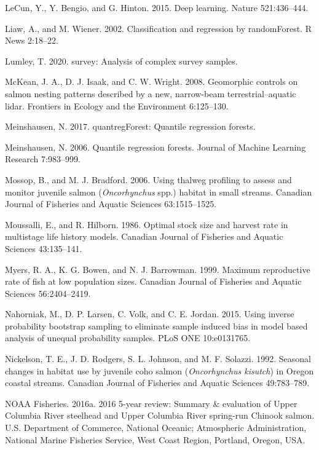 \documentclass[
  12pt,
]{article}
\begin{document}
\leavevmode\hypertarget{ref-LeCun2015}{}%
LeCun, Y., Y. Bengio, and G. Hinton. 2015. Deep learning. Nature 521:436--444.

\leavevmode\hypertarget{ref-randomForest2002}{}%
Liaw, A., and M. Wiener. 2002. Classification and regression by randomForest. R News 2:18--22.

\leavevmode\hypertarget{ref-R-survey}{}%
Lumley, T. 2020. survey: Analysis of complex survey samples.

\leavevmode\hypertarget{ref-McKean2008}{}%
McKean, J. A., D. J. Isaak, and C. W. Wright. 2008. Geomorphic controls on salmon nesting patterns described by a new, narrow-beam terrestrial--aquatic lidar. Frontiers in Ecology and the Environment 6:125--130.

\leavevmode\hypertarget{ref-R-quantregForest}{}%
Meinshausen, N. 2017. quantregForest: Quantile regression forests.

\leavevmode\hypertarget{ref-Meinshausen2006}{}%
Meinshausen, N. 2006. Quantile regression forests. Journal of Machine Learning Research 7:983--999.

\leavevmode\hypertarget{ref-Mossop2006}{}%
Mossop, B., and M. J. Bradford. 2006. Using thalweg profiling to assess and monitor juvenile salmon (\emph{Oncorhynchus} spp.) habitat in small streams. Canadian Journal of Fisheries and Aquatic Sciences 63:1515--1525.

\leavevmode\hypertarget{ref-Moussalli1986}{}%
Moussalli, E., and R. Hilborn. 1986. Optimal stock size and harvest rate in multistage life history models. Canadian Journal of Fisheries and Aquatic Sciences 43:135--141.

\leavevmode\hypertarget{ref-Myers1999}{}%
Myers, R. A., K. G. Bowen, and N. J. Barrowman. 1999. Maximum reproductive rate of fish at low population sizes. Canadian Journal of Fisheries and Aquatic Sciences 56:2404--2419.

\leavevmode\hypertarget{ref-Nahorniak2015}{}%
Nahorniak, M., D. P. Larsen, C. Volk, and C. E. Jordan. 2015. Using inverse probability bootstrap sampling to eliminate sample induced bias in model based analysis of unequal probability samples. PLoS ONE 10:e0131765.

\leavevmode\hypertarget{ref-Nickelson1992}{}%
Nickelson, T. E., J. D. Rodgers, S. L. Johnson, and M. F. Solazzi. 1992. Seasonal changes in habitat use by juvenile coho salmon (\emph{Oncorhynchus kisutch}) in Oregon coastal streams. Canadian Journal of Fisheries and Aquatic Sciences 49:783--789.

\leavevmode\hypertarget{ref-NOAA2016}{}%
NOAA Fisheries. 2016a. 2016 5-year review: Summary \& evaluation of Upper Columbia River steelhead and Upper Columbia River spring-run Chinook salmon. U.S. Department of Commerce, National Oceanic; Atmospheric Administration, National Marine Fisheries Service, West Coast Region, Portland, Oregon, USA.
\end{document}
